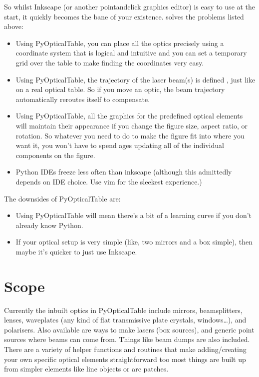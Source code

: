 \documentclass[letterpaper,10pt,english]{sphinxmanual}
\begin{document}
\sphinxAtStartPar
So whilst Inkscape (or another point\sphinxhyphen{}and\sphinxhyphen{}click graphics editor) is easy to use at the start, it quickly becomes the bane of your existence.  solves the problems listed above:
\begin{itemize}
\item {} 
\sphinxAtStartPar
Using PyOpticalTable, you can place all the optics precisely using a coordinate system that is logical and intuitive \sphinxhyphen{} and you can set a temporary grid over the table to make finding the coordinates very easy.

\item {} 
\sphinxAtStartPar
Using PyOpticalTable, the trajectory of the laser beam(s) is defined , just like on a real optical table. So if you move an optic, the beam trajectory automatically reroutes itself to compensate.

\item {} 
\sphinxAtStartPar
Using PyOpticalTable, all the graphics for the pre\sphinxhyphen{}defined optical elements will maintain their appearance if you change the figure size, aspect ratio, or rotation. So whatever you need to do to make the figure fit into where you want it, you won’t have to spend ages updating all of the individual components on the figure.

\item {} 
\sphinxAtStartPar
Python IDEs freeze less often than inkscape (although this admittedly depends on IDE choice. Use vim for the sleekest experience.)

\end{itemize}

\sphinxAtStartPar
The downsides of PyOpticalTable are:
\begin{itemize}
\item {} 
\sphinxAtStartPar
Using PyOpticalTable will mean there’s a bit of a learning curve if you don’t already know Python.

\item {} 
\sphinxAtStartPar
If your optical setup is very simple (like, two mirrors and a box simple), then maybe it’s quicker to just use Inkscape.

\end{itemize}


\chapter{Scope}
\label{\detokenize{index:scope}}
\sphinxAtStartPar
Currently the inbuilt optics in PyOpticalTable include mirrors, beamsplitters, lenses, waveplates (any kind of flat transmissive plate \sphinxhyphen{} crystals, windows…), and polarisers. Also available are ways to make lasers (\textquotesingle{}box\textquotesingle{} sources), and generic point sources where beams can come from. Things like beam dumps are also included. There are a variety of helper functions and routines that make adding/creating your own specific optical elements straightforward too \sphinxhyphen{} most things are built up from simpler elements like line objects or arc patches.
\end{document}
